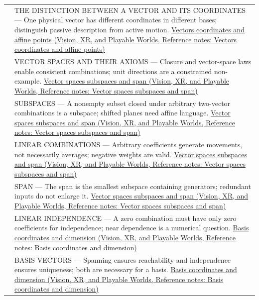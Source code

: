 {\begin{longtable}[]{@{}
  >{\raggedright\arraybackslash}p{}
  >{\raggedright\arraybackslash}p{}@{}}
506 & THE DISTINCTION BETWEEN A VECTOR AND ITS COORDINATES --- One physical vector has different coordinates in different bases; distinguish passive description from active motion. \href{../07-Vision-XR-and-Playable-Worlds/main.pdf\#nameddest=appendix-0659864c0aa3}{Vectors coordinates and affine points (Vision, XR, and Playable Worlds, Reference notes: Vectors coordinates and affine points)} \\
507 & VECTOR SPACES AND THEIR AXIOMS --- Closure and vector-space laws enable consistent combinations; unit directions are a constrained non-example. \href{../07-Vision-XR-and-Playable-Worlds/main.pdf\#nameddest=appendix-173b52c063ae}{Vector spaces subspaces and span (Vision, XR, and Playable Worlds, Reference notes: Vector spaces subspaces and span)} \\
508 & SUBSPACES --- A nonempty subset closed under arbitrary two-vector combinations is a subspace; shifted planes need affine language. \href{../07-Vision-XR-and-Playable-Worlds/main.pdf\#nameddest=appendix-173b52c063ae}{Vector spaces subspaces and span (Vision, XR, and Playable Worlds, Reference notes: Vector spaces subspaces and span)} \\
509 & LINEAR COMBINATIONS --- Arbitrary coefficients generate movements, not necessarily averages; negative weights are valid. \href{../07-Vision-XR-and-Playable-Worlds/main.pdf\#nameddest=appendix-173b52c063ae}{Vector spaces subspaces and span (Vision, XR, and Playable Worlds, Reference notes: Vector spaces subspaces and span)} \\
510 & SPAN --- The span is the smallest subspace containing generators; redundant inputs do not enlarge it. \href{../07-Vision-XR-and-Playable-Worlds/main.pdf\#nameddest=appendix-173b52c063ae}{Vector spaces subspaces and span (Vision, XR, and Playable Worlds, Reference notes: Vector spaces subspaces and span)} \\
511 & LINEAR INDEPENDENCE --- A zero combination must have only zero coefficients for independence; near dependence is a numerical question. \href{../07-Vision-XR-and-Playable-Worlds/main.pdf\#nameddest=appendix-ce0341f7ea0d}{Basis coordinates and dimension (Vision, XR, and Playable Worlds, Reference notes: Basis coordinates and dimension)} \\
512 & BASIS VECTORS --- Spanning ensures reachability and independence ensures uniqueness; both are necessary for a basis. \href{../07-Vision-XR-and-Playable-Worlds/main.pdf\#nameddest=appendix-ce0341f7ea0d}{Basis coordinates and dimension (Vision, XR, and Playable Worlds, Reference notes: Basis coordinates and dimension)} \\

\end{longtable}}

